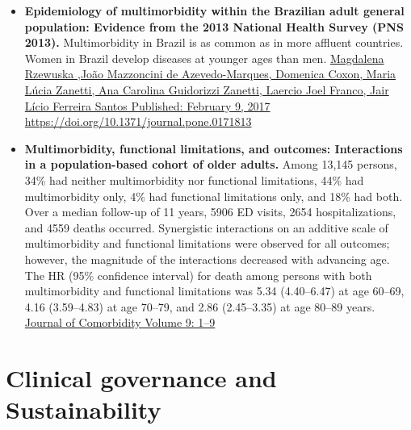 \documentclass[]{book}
\begin{document}
\begin{itemize}
\item
  \textbf{Epidemiology of multimorbidity within the Brazilian adult general population: Evidence from the 2013 National Health Survey (PNS 2013).} Multimorbidity in Brazil is as common as in more affluent countries. Women in Brazil develop diseases at younger ages than men. \href{https://journals.plos.org/plosone/article?id=10.1371/journal.pone.0171813}{Magdalena Rzewuska ,João Mazzoncini de Azevedo-Marques, Domenica Coxon, Maria Lúcia Zanetti, Ana Carolina Guidorizzi Zanetti, Laercio Joel Franco, Jair Lício Ferreira Santos Published: February 9, 2017 https://doi.org/10.1371/journal.pone.0171813}
\item
  \textbf{Multimorbidity, functional limitations, and outcomes: Interactions in a population-based cohort of older adults.} Among 13,145 persons, 34\% had neither multimorbidity nor functional limitations, 44\% had multimorbidity only, 4\% had functional limitations only, and 18\% had both. Over a median follow-up of 11 years, 5906 ED visits, 2654 hospitalizations, and 4559 deaths occurred. Synergistic interactions on an additive scale of multimorbidity and functional limitations were observed for all outcomes; however, the magnitude of the interactions decreased with advancing age. The HR (95\% confidence interval) for death among persons with both multimorbidity and functional limitations was 5.34 (4.40--6.47) at age 60--69, 4.16 (3.59--4.83) at age 70--79, and 2.86 (2.45--3.35) at age 80--89 years. \href{https://journals.sagepub.com/doi/pdf/10.1177/2235042X19873486}{Journal of Comorbidity Volume 9: 1--9}
\end{itemize}

\hypertarget{clinical-governance-and-sustainability}{%
\section*{Clinical governance and Sustainability}\label{clinical-governance-and-sustainability}}
\end{document}
